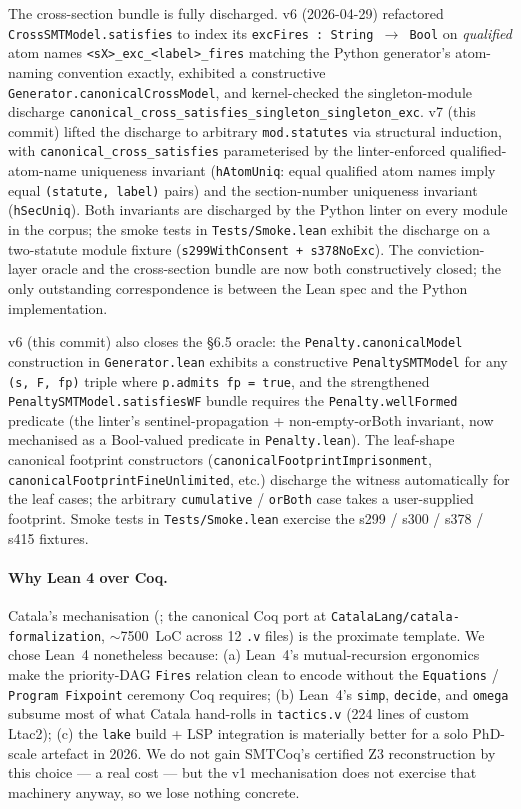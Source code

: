 The cross-section bundle is fully discharged. v6 (2026-04-29)
refactored \texttt{CrossSMTModel.satisfies} to index its
\texttt{excFires : String $\to$ Bool} on \emph{qualified}
atom names \texttt{<sX>\_exc\_<label>\_fires} matching the
Python generator's atom-naming convention exactly, exhibited
a constructive \texttt{Generator.canonicalCrossModel}, and
kernel-checked the singleton-module discharge
\texttt{canonical\_cross\_satisfies\_singleton\_singleton\_exc}.
v7 (this commit) lifted the discharge to arbitrary
\texttt{mod.statutes} via structural induction, with
\texttt{canonical\_cross\_satisfies} parameterised by the
linter-enforced qualified-atom-name uniqueness invariant
(\texttt{hAtomUniq}: equal qualified atom names imply equal
\texttt{(statute, label)} pairs) and the section-number
uniqueness invariant (\texttt{hSecUniq}). Both invariants are
discharged by the Python linter on every module in the
corpus; the smoke tests in \texttt{Tests/Smoke.lean} exhibit
the discharge on a two-statute module fixture
(\texttt{s299WithConsent + s378NoExc}). The conviction-layer
oracle and the cross-section bundle are now both
constructively closed; the only outstanding correspondence
is between the Lean spec and the Python implementation.

v6 (this commit) also closes the §6.5 oracle: the
\texttt{Penalty.canonicalModel} construction in
\texttt{Generator.lean} exhibits a constructive
\texttt{PenaltySMTModel} for any \texttt{(s, F, fp)} triple
where \texttt{p.admits fp = true}, and the strengthened
\texttt{PenaltySMTModel.satisfiesWF} bundle requires the
\texttt{Penalty.wellFormed} predicate (the linter's
sentinel-propagation + non-empty-orBoth invariant, now
mechanised as a Bool-valued predicate in
\texttt{Penalty.lean}). The leaf-shape canonical footprint
constructors (\texttt{canonicalFootprintImprisonment},
\texttt{canonicalFootprintFineUnlimited}, etc.) discharge
the witness automatically for the leaf cases; the arbitrary
\texttt{cumulative} / \texttt{orBoth} case takes a
user-supplied footprint. Smoke tests in
\texttt{Tests/Smoke.lean} exercise the s299 / s300 / s378 /
s415 fixtures.

\paragraph{Why Lean 4 over Coq.}
Catala's mechanisation
(\cite{catala2021}; the canonical Coq port at
\texttt{CatalaLang/catala-formalization}, $\sim$7500~LoC across
12 \texttt{.v} files) is the proximate template. We chose Lean~4
nonetheless because: (a) Lean~4's mutual-recursion ergonomics
make the priority-DAG \texttt{Fires} relation clean to encode
without the \texttt{Equations} / \texttt{Program Fixpoint}
ceremony Coq requires; (b) Lean~4's \texttt{simp}, \texttt{decide},
and \texttt{omega} subsume most of what Catala hand-rolls in
\texttt{tactics.v} (224 lines of custom Ltac2); (c) the
\texttt{lake} build + LSP integration is materially better for
a solo PhD-scale artefact in 2026. We do not gain SMTCoq's
certified Z3 reconstruction by this choice --- a real cost ---
but the v1 mechanisation does not exercise that machinery anyway,
so we lose nothing concrete.

